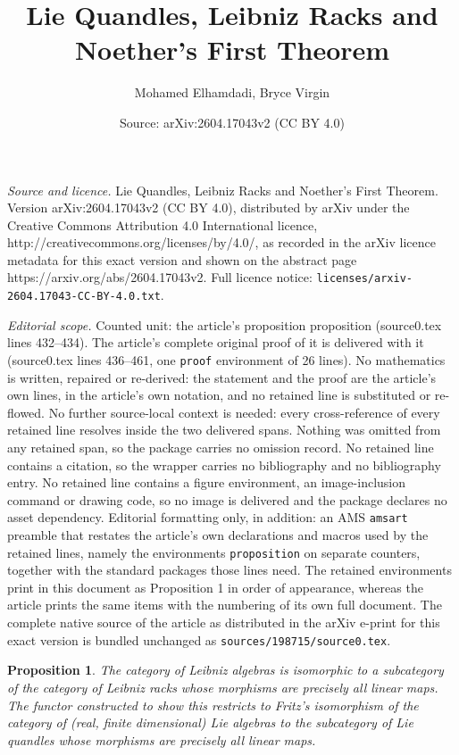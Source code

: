 \documentclass[10pt,a4paper]{amsart}
\title{Lie Quandles, Leibniz Racks and Noether's First Theorem}
\author{Mohamed Elhamdadi, Bryce Virgin}
\date{Source: arXiv:2604.17043v2 (CC BY 4.0)}
\newtheorem{proposition}{Proposition}
\begin{document}
\maketitle

\noindent\emph{Source and licence.} Lie Quandles, Leibniz Racks and Noether's First Theorem. Version arXiv:2604.17043v2 (CC BY 4.0), distributed by arXiv under the Creative Commons Attribution 4.0 International licence, http://creativecommons.org/licenses/by/4.0/, as recorded in the arXiv licence metadata for this exact version and shown on the abstract page https://arxiv.org/abs/2604.17043v2. Full licence notice: \texttt{licenses/arxiv-2604.17043-CC-BY-4.0.txt}.\par\smallskip

\noindent\textit{Editorial scope.} Counted unit: the article's proposition proposition (source0.tex lines 432--434). The article's complete original proof of it is delivered with it (source0.tex lines 436--461, one \texttt{proof} environment of 26 lines). No mathematics is written, repaired or re-derived: the statement and the proof are the article's own lines, in the article's own notation, and no retained line is substituted or re-flowed.  No further source-local context is needed: every cross-reference of every retained line resolves inside the two delivered spans.  Nothing was omitted from any retained span, so the package carries no omission record.  No retained line contains a citation, so the wrapper carries no bibliography and no bibliography entry.  No retained line contains a figure environment, an image-inclusion command or drawing code, so no image is delivered and the package declares no asset dependency.  Editorial formatting only, in addition: an AMS \texttt{amsart} preamble that restates the article's own declarations and macros used by the retained lines, namely the environments \texttt{proposition} on separate counters, together with the standard packages those lines need.  The retained environments print in this document as Proposition 1 in order of appearance, whereas the article prints the same items with the numbering of its own full document.  The complete native source of the article as distributed in the arXiv e-print for this exact version is bundled unchanged as \texttt{sources/198715/source0.tex}.
\begin{proposition}
The category of Leibniz algebras is isomorphic to a subcategory of the category of Leibniz racks whose morphisms are precisely all linear maps. The functor constructed to show this restricts to Fritz's isomorphism of the category of (real, finite dimensional) Lie algebras to the subcategory of Lie quandles whose morphisms are precisely all linear maps.
\end{proposition}
\end{document}

